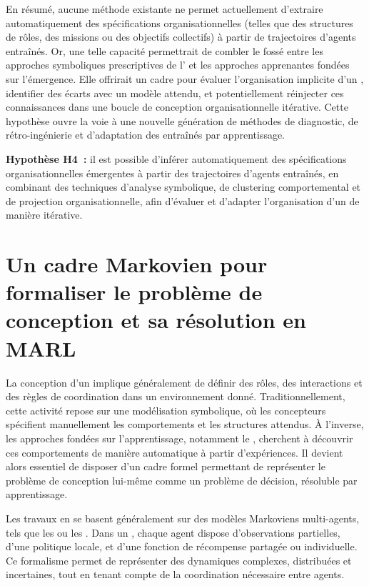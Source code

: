 En résumé, aucune méthode existante ne permet actuellement d'extraire automatiquement des spécifications organisationnelles (telles que des structures de rôles, des missions ou des objectifs collectifs) à partir de trajectoires d'agents entraînés. Or, une telle capacité permettrait de combler le fossé entre les approches symboliques prescriptives de l' et les approches apprenantes fondées sur l'émergence. Elle offrirait un cadre pour évaluer l'organisation implicite d'un , identifier des écarts avec un modèle attendu, et potentiellement réinjecter ces connaissances dans une boucle de conception organisationnelle itérative. Cette hypothèse ouvre la voie à une nouvelle génération de méthodes de diagnostic, de rétro-ingénierie et d'adaptation des  entraînés par apprentissage.

\medskip

\noindent
\textbf{Hypothèse H4~:} il est possible d'inférer automatiquement des spécifications organisationnelles émergentes à partir des trajectoires d'agents entraînés, en combinant des techniques d'analyse symbolique, de clustering comportemental et de projection organisationnelle, afin d'évaluer et d'adapter l'organisation d'un  de manière itérative.


\section{Un cadre Markovien pour formaliser le problème de conception et sa résolution en MARL}

\noindent
La conception d'un  implique généralement de définir des rôles, des interactions et des règles de coordination dans un environnement donné. Traditionnellement, cette activité repose sur une modélisation symbolique, où les concepteurs spécifient manuellement les comportements et les structures attendus. À l'inverse, les approches fondées sur l'apprentissage, notamment le , cherchent à découvrir ces comportements de manière automatique à partir d'expériences. Il devient alors essentiel de disposer d'un cadre formel permettant de représenter le problème de conception lui-même comme un problème de décision, résoluble par apprentissage.

\medskip

\noindent
Les travaux en  se basent généralement sur des modèles Markoviens multi-agents, tels que les  ou les . Dans un , chaque agent dispose d'observations partielles, d'une politique locale, et d'une fonction de récompense partagée ou individuelle. Ce formalisme permet de représenter des dynamiques complexes, distribuées et incertaines, tout en tenant compte de la coordination nécessaire entre agents.

